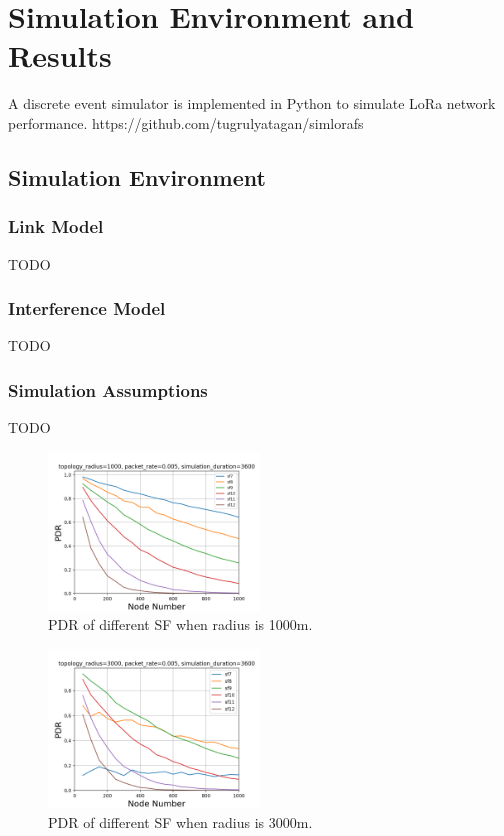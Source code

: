 \documentclass[conference]{IEEEtran}
\begin{document}
\section{Simulation Environment and Results}
A discrete event simulator is implemented in Python to simulate LoRa network performance. 
https://github.com/tugrulyatagan/simlorafs

\subsection{Simulation Environment}

\subsubsection{Link Model}
TODO

\subsubsection{Interference Model}
TODO

\subsubsection{Simulation Assumptions}
TODO

\begin{figure}
\centering
\includegraphics[width=0.5\textwidth]{sf_1000}
\caption{PDR of different SF when radius is 1000m.}
\label{fig:sf_1000}
\end{figure}

\begin{figure}
\centering
\includegraphics[width=0.5\textwidth]{sf_3000}
\caption{PDR of different SF when radius is 3000m.}
\label{fig:sf_3000}
\end{figure}
\end{document}
